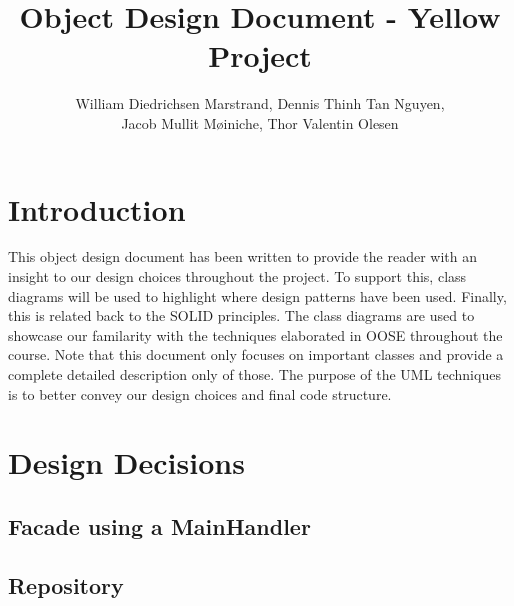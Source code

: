 \documentclass{article}
\title{Object Design Document - Yellow Project}
\author{William Diedrichsen Marstrand, Dennis Thinh Tan Nguyen, 
\\Jacob Mullit M{\o}iniche, Thor Valentin Olesen}
\begin{document}
\maketitle
\newpage
\tableofcontents
\newpage

\section{Introduction}

This object design document has been written to provide the reader with an insight to our design choices throughout the project. To support this, class diagrams will be used to highlight where design patterns have been used. Finally, this is related back to the SOLID principles. The class diagrams are used to showcase our familarity with the techniques elaborated in OOSE throughout the course. Note that this document only focuses on important classes and provide a complete detailed description only of those. The purpose of the UML techniques is to better convey our design choices and final code structure. 



\section{Design Decisions}
	\subsection{Facade using a MainHandler}
		
	\subsection{Repository}
		
\end{document}
